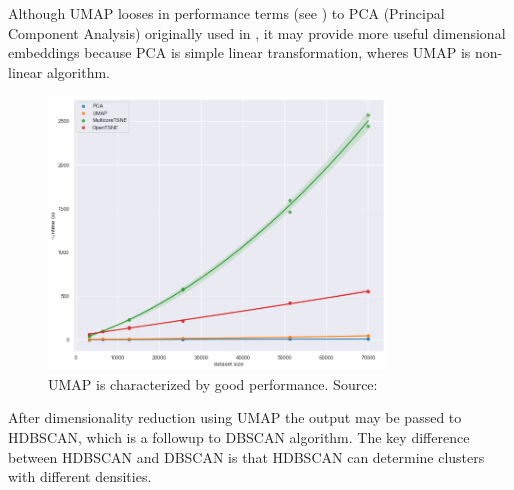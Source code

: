 Although UMAP looses in performance terms (see ) to PCA (Principal Component Analysis) originally used in \cite{Lach2022}, it may provide more useful dimensional embeddings because PCA is simple linear transformation, wheres UMAP is non-linear algorithm. 
\begin{figure}[H] 
  \centering     
  \includegraphics[width=0.8\textwidth]{img/performance_umap.png} 
  \caption{UMAP is characterized by good performance. Source: \cite{umapPerformance}}
  \label{fig:umap_performance}
\end{figure}

After dimensionality reduction using UMAP the output may be passed to HDBSCAN, which is a followup to DBSCAN algorithm.
The key difference between HDBSCAN and DBSCAN is that HDBSCAN can determine clusters with different densities.
